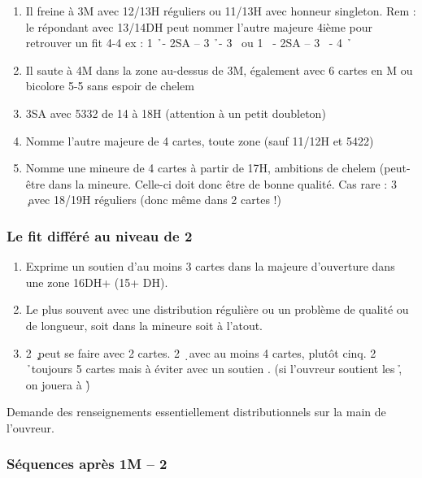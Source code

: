\documentclass[a4paper]{article}
\begin{document}
\begin{enumerate}
\item Il freine à 3M avec 12/13H réguliers ou 11/13H avec honneur singleton.
Rem : le répondant avec 13/14DH peut nommer l’autre majeure 4ième pour retrouver un fit 4-4
 ex : 1 \h\ - 2SA – 3 \h\ - 3 \s\ ou 1 \s\ - 2SA – 3 \s\ - 4 \h\ 

\item Il saute à 4M dans la zone au-dessus de 3M, également avec 6 cartes en M ou bicolore 5-5 sans 
espoir de chelem

\item 3SA avec 5332 de 14 à 18H (attention à un petit doubleton) 

\item Nomme l’autre majeure de 4 cartes, toute zone (sauf 11/12H et 5422)

\item Nomme une mineure de 4 cartes à partir de 17H, ambitions de chelem (peut-être dans la 
mineure. Celle-ci doit donc être de bonne qualité.
Cas rare : 3 \c\ avec 18/19H réguliers (donc même dans 2 cartes !)

\end{enumerate}

\subsubsection{Le fit différé au niveau de 2}

\begin{enumerate}
\item Exprime un soutien d’au moins 3 cartes dans la majeure 
d’ouverture dans une zone 16DH+ (15+
DH).

\item Le plus souvent avec une distribution régulière ou un 
problème de qualité ou de longueur, soit dans la mineure soit 
à l’atout.

\item 2 \c\ peut se faire avec 2 cartes.
2 \d\ avec au moins 4 cartes, plutôt cinq.
2 \h\ toujours 5 cartes mais à éviter avec un soutien \s . (si 
l’ouvreur soutient les \h , on jouera à \h )

\end{enumerate}

Demande des renseignements essentiellement distributionnels sur 
la main de l’ouvreur.

\subsubsection{Séquences après 1M – 2 \pdfc}
\end{document}
